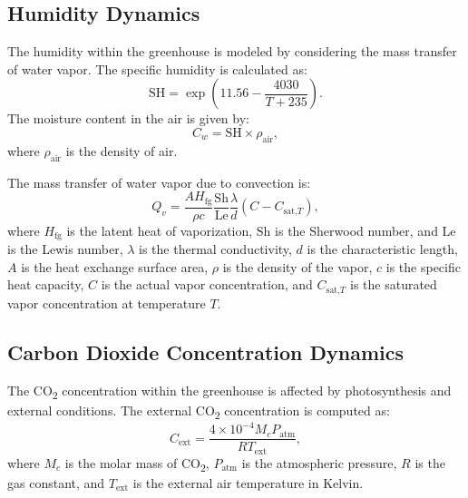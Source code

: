 \documentclass[conference]{IEEEtran}
\begin{document}
\subsection{Humidity Dynamics}\label{subsec:humidity}

The humidity within the greenhouse is modeled by considering the mass transfer of water vapor. The specific humidity is calculated as:
\begin{equation}
    \text{SH} = \exp\left(11.56 - \frac{4030}{T + 235}\right).
\end{equation}
The moisture content in the air is given by:
\begin{equation}
    C_w = \text{SH} \times \rho_{\text{air}},
\end{equation}
where \(\rho_{\text{air}}\) is the density of air.

The mass transfer of water vapor due to convection is:
\begin{equation}
    Q_{v} = \frac{A  H_{\text{fg}}}{\rho  c}  \frac{\text{Sh}}{\text{Le}}  \frac{\lambda}{d}  \left( C - C_{\text{sat,}T} \right),
\end{equation}
where \(H_{\text{fg}}\) is the latent heat of vaporization, \(\text{Sh}\) is the Sherwood number, and \(\text{Le}\) is the Lewis number,
\(\lambda \) is the thermal conductivity,
\(d\) is the characteristic length, \(A\) is the heat exchange surface area, \(\rho \) is the density of the vapor, \(c\) is the specific heat capacity,
\(C\) is the actual vapor concentration, and \(C_{\text{sat,}T}\) is the saturated vapor concentration at temperature \(T\).

\subsection{Carbon Dioxide Concentration Dynamics}

The CO\textsubscript{2} concentration within the greenhouse is affected by photosynthesis and external conditions. The external CO\textsubscript{2} concentration is computed as:
\begin{equation}
    C_{\text{ext}} = \frac{4 \times 10^{-4}  M_c  P_{\text{atm}}}{R  T_{\text{ext}}},
\end{equation}
where \(M_c\) is the molar mass of CO\textsubscript{2}, \(P_{\text{atm}}\) is the atmospheric pressure, \(R\) is the gas constant, and \(T_{\text{ext}}\) is the external air temperature in Kelvin.
\end{document}
